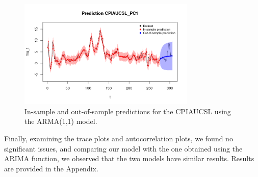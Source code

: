 \begin{figure}[H]
    \centering
    \includegraphics[width=0.75\textwidth]{images/4-ARMA/infl_prediction.png}
    \caption{In-sample and out-of-sample predictions for the CPIAUCSL using the ARMA(1,1) model.}
    \label{fig:ARMA1,1_infl_prediction}
\end{figure}
Finally, examining the trace plots and autocorrelation plots, we found no significant issues, and comparing our model with the one obtained using the ARIMA function, we observed that the two models have similar results. Results are provided in the Appendix.